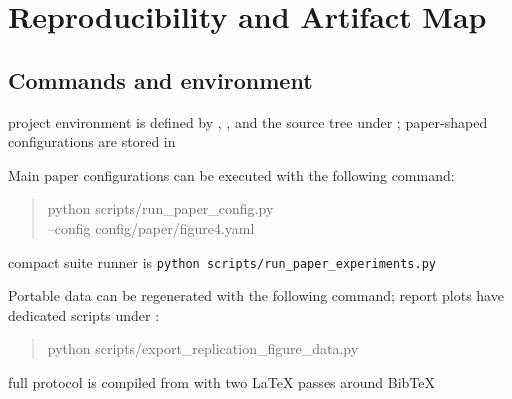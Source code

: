 \section{Reproducibility and Artifact Map}

\subsection{Commands and environment}
\begin{draftpoints}
  \item project environment is defined by , , and the source tree under ; paper-shaped configurations are stored in 
  \item Main paper configurations can be executed with the following command:
  \begin{quote}\footnotesize\ttfamily
  python scripts/run\_paper\_config.py\\
  \hspace*{1em}--config config/paper/figure4.yaml
  \end{quote}
  \item compact suite runner is \texttt{python scripts/run\_paper\_experiments.py}
  \item Portable data can be regenerated with the following command; report plots have dedicated scripts under :
  \begin{quote}\footnotesize\ttfamily
  python scripts/export\_replication\_figure\_data.py
  \end{quote}
  \item full protocol is compiled from  with two LaTeX passes around BibTeX
\end{draftpoints}

